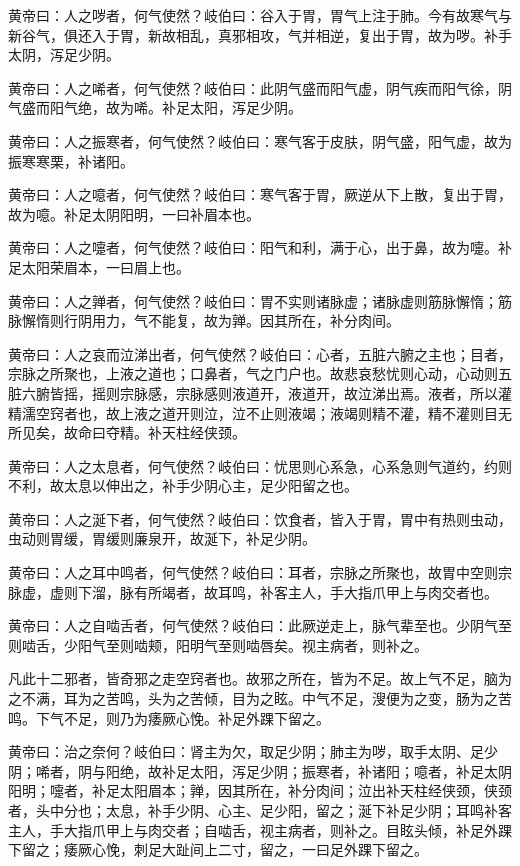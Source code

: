 \documentclass[a4paper,12pt,UTF8,twoside]{ctexbook}
\begin{document}
	黄帝曰：人之哕者，何气使然？岐伯曰：谷入于胃，胃气上注于肺。今有故寒气与新谷气，俱还入于胃，新故相乱，真邪相攻，气并相逆，复出于胃，故为哕。补手太阴，泻足少阴。
	
	黄帝曰：人之唏者，何气使然？岐伯曰：此阴气盛而阳气虚，阴气疾而阳气徐，阴气盛而阳气绝，故为唏。补足太阳，泻足少阴。
	
	黄帝曰：人之振寒者，何气使然？岐伯曰：寒气客于皮肤，阴气盛，阳气虚，故为振寒寒栗，补诸阳。
	
	黄帝曰：人之噫者，何气使然？岐伯曰：寒气客于胃，厥逆从下上散，复出于胃，故为噫。补足太阴阳明，一曰补眉本也。
	
	黄帝曰：人之嚏者，何气使然？岐伯曰：阳气和利，满于心，出于鼻，故为嚏。补足太阳荣眉本，一曰眉上也。
	
	黄帝曰：人之亸者，何气使然？岐伯曰：胃不实则诸脉虚；诸脉虚则筋脉懈惰；筋脉懈惰则行阴用力，气不能复，故为亸。因其所在，补分肉间。
	
	黄帝曰：人之哀而泣涕出者，何气使然？岐伯曰：心者，五脏六腑之主也；目者，宗脉之所聚也，上液之道也；口鼻者，气之门户也。故悲哀愁忧则心动，心动则五脏六腑皆摇，摇则宗脉感，宗脉感则液道开，液道开，故泣涕出焉。液者，所以灌精濡空窍者也，故上液之道开则泣，泣不止则液竭；液竭则精不灌，精不灌则目无所见矣，故命曰夺精。补天柱经侠颈。
	
	黄帝曰：人之太息者，何气使然？岐伯曰：忧思则心系急，心系急则气道约，约则不利，故太息以伸出之，补手少阴心主，足少阳留之也。
	
	黄帝曰：人之涎下者，何气使然？岐伯曰：饮食者，皆入于胃，胃中有热则虫动，虫动则胃缓，胃缓则廉泉开，故涎下，补足少阴。
	
	黄帝曰：人之耳中鸣者，何气使然？岐伯曰：耳者，宗脉之所聚也，故胃中空则宗脉虚，虚则下溜，脉有所竭者，故耳鸣，补客主人，手大指爪甲上与肉交者也。
	
	黄帝曰：人之自啮舌者，何气使然？岐伯曰：此厥逆走上，脉气辈至也。少阴气至则啮舌，少阳气至则啮颊，阳明气至则啮唇矣。视主病者，则补之。
	
	凡此十二邪者，皆奇邪之走空窍者也。故邪之所在，皆为不足。故上气不足，脑为之不满，耳为之苦鸣，头为之苦倾，目为之眩。中气不足，溲便为之变，肠为之苦鸣。下气不足，则乃为痿厥心悗。补足外踝下留之。
	
	黄帝曰：治之奈何？岐伯曰：肾主为欠，取足少阴；肺主为哕，取手太阴、足少阴；唏者，阴与阳绝，故补足太阳，泻足少阴；振寒者，补诸阳；噫者，补足太阴阳明；嚏者，补足太阳眉本；亸，因其所在，补分肉间；泣出补天柱经侠颈，侠颈者，头中分也；太息，补手少阴、心主、足少阳，留之；涎下补足少阴；耳鸣补客主人，手大指爪甲上与肉交者；自啮舌，视主病者，则补之。目眩头倾，补足外踝下留之；痿厥心悗，刺足大趾间上二寸，留之，一曰足外踝下留之。
	
\end{document}
